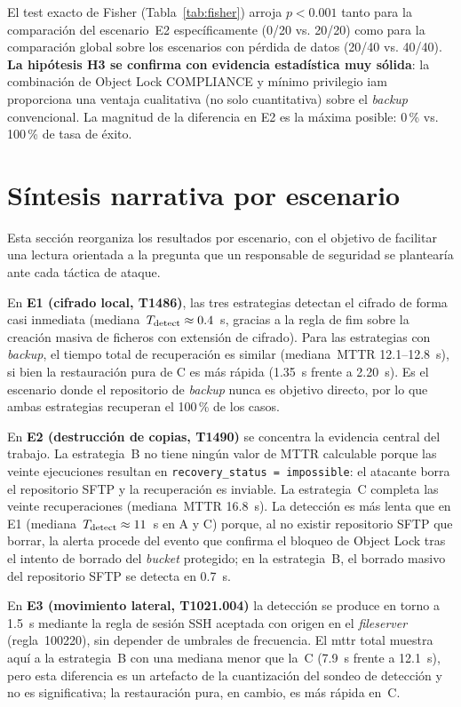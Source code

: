 \documentclass[../main.tex]{subfiles}
\begin{document}
El test exacto de Fisher (Tabla~\ref{tab:fisher}) arroja $p < 0.001$ tanto para la comparación del
escenario~E2 específicamente (0/20 vs. 20/20) como para la comparación global sobre
los escenarios con pérdida de datos (20/40 vs. 40/40). \textbf{La hipótesis H3 se
confirma con evidencia estadística muy sólida}: la combinación de Object Lock
COMPLIANCE y mínimo privilegio \gls{iam} proporciona una ventaja cualitativa (no solo
cuantitativa) sobre el \emph{backup} convencional. La magnitud de la diferencia en E2
es la máxima posible: 0\,\% vs. 100\,\% de tasa de éxito.

\section{Síntesis narrativa por escenario}
\label{sec:sintesis-escenarios}

Esta sección reorganiza los resultados por escenario, con el objetivo de facilitar una
lectura orientada a la pregunta que un responsable de seguridad se plantearía ante
cada táctica de ataque.

En \textbf{E1 (cifrado local, T1486)}, las tres estrategias detectan el cifrado de
forma casi inmediata (mediana~$T_{\text{detect}} \approx 0.4$~s, gracias a la regla de
\gls{fim} sobre la creación masiva de ficheros con extensión de cifrado). Para las
estrategias con \emph{backup}, el tiempo total de recuperación es similar
(mediana~MTTR 12.1--12.8~s), si bien la restauración pura de C es más rápida
(1.35~s frente a 2.20~s). Es el escenario donde el repositorio de \emph{backup} nunca
es objetivo directo, por lo que ambas estrategias recuperan el 100\,\% de los casos.

En \textbf{E2 (destrucción de copias, T1490)} se concentra la evidencia central del
trabajo. La estrategia~B no tiene ningún valor de MTTR calculable porque las veinte
ejecuciones resultan en \texttt{recovery\_status = impossible}: el atacante borra el
repositorio SFTP y la recuperación es inviable. La estrategia~C completa las veinte
recuperaciones (mediana~MTTR 16.8~s). La detección es más lenta que en E1
(mediana~$T_{\text{detect}} \approx 11$~s en A y C) porque, al no existir repositorio SFTP que
borrar, la alerta procede del evento que confirma el bloqueo de Object Lock tras el
intento de borrado del \emph{bucket} protegido; en la estrategia~B, el borrado masivo
del repositorio SFTP se detecta en 0.7~s.

En \textbf{E3 (movimiento lateral, T1021.004)} la detección se produce en torno a
1.5~s mediante la regla de sesión SSH aceptada con origen en el \emph{fileserver}
(regla~100220), sin depender de umbrales de frecuencia. El \gls{mttr} total muestra
aquí a la estrategia~B con una mediana menor que la~C (7.9~s frente a 12.1~s), pero
esta diferencia es un artefacto de la cuantización del sondeo de detección y no es
significativa; la restauración pura, en cambio, es más rápida en~C.
\end{document}
